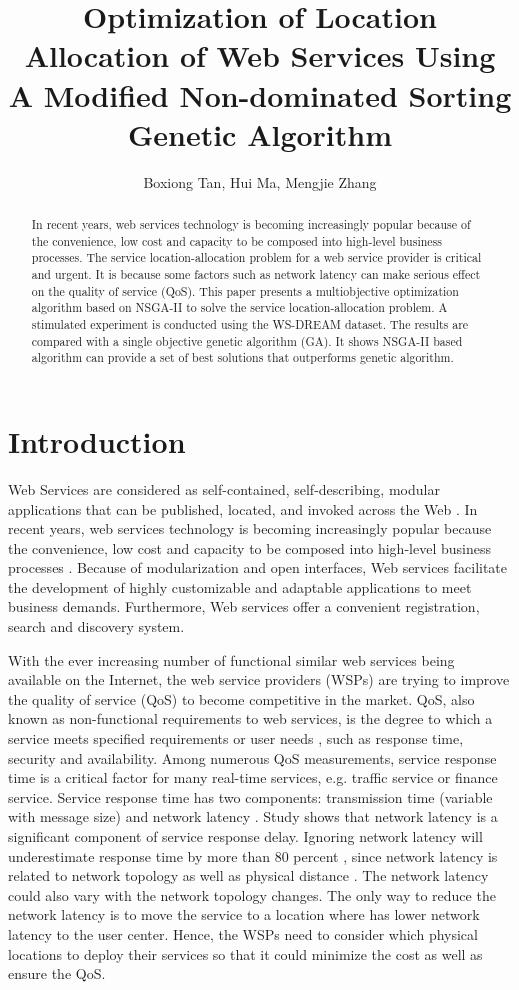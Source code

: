 \documentclass{llncs}
\title{
Optimization of Location Allocation of Web Services Using A Modified Non-dominated Sorting Genetic Algorithm
}
\author{Boxiong Tan, Hui Ma, Mengjie Zhang}
\institute{School of Engineering and Computer Science,
\\Victoria University of Wellington, New Zealand \\
\email{\{Boxiong.Tan, Hui.Ma, Mengjie.Zhang\}@ecs.vuw.ac.nz}}
\begin{document}
\maketitle

\begin{abstract}
In recent years, web services technology is becoming increasingly popular because of the convenience, 
low cost and capacity to be composed into high-level business processes. 
The service location-allocation problem for a web service provider is critical and urgent. 
It is because some factors such as network latency can make serious effect on the quality of service (QoS). 
This paper presents a multiobjective optimization algorithm based on NSGA-II to solve the service location-allocation problem. 
A stimulated experiment is conducted using the WS-DREAM dataset. 
The results are compared with a single objective genetic algorithm (GA). 
It shows NSGA-II based algorithm can provide a set of best solutions that outperforms genetic algorithm.
\end{abstract}

\section{Introduction}
Web Services are considered as self-contained, self-describing, modular applications that can be published, located, and invoked across the Web \cite{Ran}. 
In recent years, web services technology is becoming increasingly popular because the convenience, low cost and capacity to be composed into high-level business processes \cite{Aboolian}.
Because of modularization and open interfaces, Web services facilitate the development of highly 
customizable and adaptable applications to meet business demands. Furthermore, Web services offer a 
convenient registration, search  and discovery system.

With the ever increasing number of functional similar web services being available on the Internet, the web service providers (WSPs) are trying to improve the quality of service (QoS) to become competitive in the market.  
QoS, also known as non-functional requirements to  web services, is the degree to which a service meets specified requirements or user needs \cite{4061431}, such as response time, security and availability. 
Among numerous QoS measurements, service response time is a critical factor for many real-time services, e.g. traffic service or finance service. 
Service response time has two components: transmission time (variable with message size) and network latency \cite{Johansson}. 
Study \cite{916684} shows that network latency is a significant component of service response delay.
Ignoring network latency will underestimate response time by more than 80 percent \cite{Sun}, since network latency is related to network topology as well as physical distance \cite{distanceMetrics}. 
The network latency could also vary with the network topology changes.
The only way to reduce the network latency is to move the service to a location where has lower network latency to the user center. 
Hence, the WSPs need to consider which physical locations to deploy their services so that it could minimize the cost as well as ensure the QoS.
\end{document}
